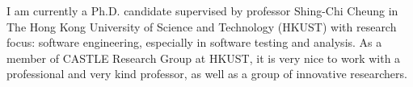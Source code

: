%
%
%
\par{
    I am currently a Ph.D. candidate supervised by professor Shing-Chi Cheung in The Hong Kong University of Science and Technology (HKUST) with research focus: software engineering, especially in software testing and analysis.
    As a member of CASTLE Research Group at HKUST, it is very nice to work with a professional and very kind professor, as well as a group of innovative researchers.
}